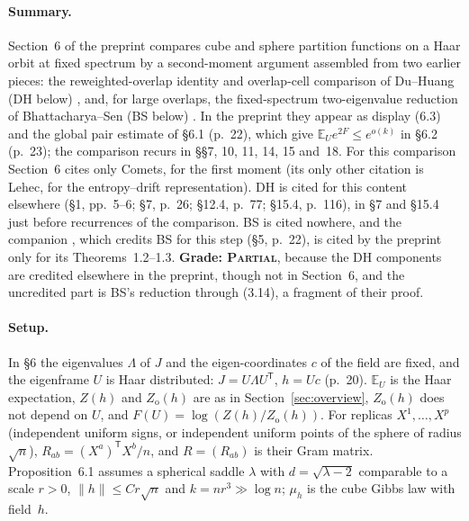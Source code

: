 \documentclass[11pt]{article}
\newcommand{\E}{\mathbb{E}}
\newcommand{\norm}[1]{\lVert #1\rVert}
\newcommand{\ploc}[2]{#1}
\newcommand{\sloc}[2]{\cite[#2]{#1}}
\newcommand{\grade}[1]{\textsc{#1}}
\begin{document}
\paragraph{Summary.}
Section~6 of the preprint compares cube and sphere partition functions on a
Haar orbit at fixed spectrum by a second-moment argument assembled from two
earlier pieces: the reweighted-overlap identity and overlap-cell comparison of
Du--Huang (DH below)
\sloc{DuHuang2026-CriticalSKFreeEnergyFluctuations}{Lemmas~2.1 and~3.9, proof
of Thm.~1.6}, and, for large overlaps, the fixed-spectrum two-eigenvalue
reduction of Bhattacharya--Sen (BS below)
\sloc{BhattacharyaSen2015-OrthogonalMeanFieldSpinGlasses}{\S3.2.1, eq.~(3.14)}.
In the preprint they appear as display
\ploc{(6.3)}{profile-spectral.tex:712--730} and the global pair estimate of
\ploc{\S6.1 (p.~22)}{profile-spectral.tex:788--837}, which give
$\E_Ue^{2F}\le e^{o(k)}$ in \ploc{\S6.2 (p.~23)}{profile-spectral.tex:841--848};
the comparison recurs in \S\S7, 10, 11, 14, 15 and~18. For this comparison
Section~6 cites only Comets, for the first moment (its only other citation is
Lehec, for the entropy--drift representation). DH is cited for this content
elsewhere (\ploc{\S1, pp.~5--6}{introduction.tex:198--210};
\ploc{\S7, p.~26}{profile-spectral.tex:1133--1138};
\ploc{\S12.4, p.~77}{profile-amplification.tex:928--935};
\ploc{\S15.4, p.~116}{cap-static.tex:294--297}), in \S7 and \S15.4 just
before recurrences of the comparison. BS is cited nowhere, and the companion \cite{OAI-AcceptedCritical}, which credits
BS for this step \ploc{(\S5, p.~22)}{orientation.tex:12--18}, is cited by the
preprint only for its Theorems~1.2--1.3. \textbf{Grade: \grade{Partial}},
because the DH components are credited elsewhere in the preprint, though not
in Section~6, and the uncredited part is BS's reduction through (3.14), a
fragment of their proof.

\paragraph{Setup.}
In \S6 the eigenvalues $\Lambda$ of $J$ and the eigen-coordinates $c$ of the
field are fixed, and the eigenframe $U$ is Haar distributed: $J=U\Lambda
U^{\mathsf T}$, $h=Uc$ \ploc{(p.~20)}{profile-spectral.tex:660--662}. $\E_U$
is the Haar expectation, $Z(h)$ and $Z_{\mathrm o}(h)$ are as in
Section~\ref{sec:overview}, $Z_{\mathrm o}(h)$ does not depend on $U$, and
$F(U)=\log(Z(h)/Z_{\mathrm o}(h))$. For replicas $X^1,\dots,X^p$ (independent
uniform signs, or independent uniform points of the sphere of radius $\sqrt
n$), $R_{ab}=(X^a)^{\mathsf T}X^b/n$, and $R=(R_{ab})$ is their Gram matrix.
\ploc{Proposition~6.1}{profile-spectral.tex:666--707} assumes a spherical
saddle $\lambda$ with $d=\sqrt{\lambda-2}$ comparable to a scale $r>0$,
$\norm h\le Cr\sqrt n$ and $k=nr^3\gg\log n$; $\mu_h$ is the cube Gibbs law
with field~$h$.
\end{document}
